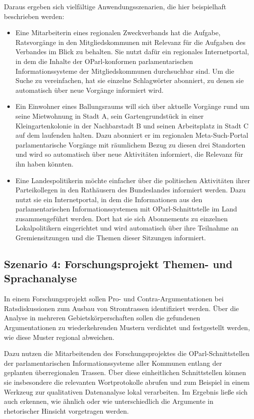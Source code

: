 \documentclass[,a4paper]{article}
\begin{document}
Daraus ergeben sich vielfältige Anwendungsszenarien, die hier
beispielhaft beschrieben werden:

\begin{itemize}
\item
  Eine Mitarbeiterin eines regionalen Zweckverbands hat die Aufgabe,
  Ratsvorgänge in den Mitgliedskommunen mit Relevanz für die Aufgaben
  des Verbandes im Blick zu behalten. Sie nutzt dafür ein regionales
  Internetportal, in dem die Inhalte der OParl-konformen
  parlamentarischen Informationssysteme der Mitgliedskommunen
  durchsuchbar sind. Um die Suche zu vereinfachen, hat sie einzelne
  Schlagwörter abonniert, zu denen sie automatisch über neue Vorgänge
  informiert wird.
\item
  Ein Einwohner eines Ballungsraums will sich über aktuelle Vorgänge
  rund um seine Mietwohnung in Stadt A, sein Gartengrundstück in einer
  Kleingartenkolonie in der Nachbarstadt B und seinen Arbeitsplatz in
  Stadt C auf dem laufenden halten. Dazu abonniert er im regionalen
  Meta-Such-Portal parlamentarische Vorgänge mit räumlichem Bezug zu
  diesen drei Standorten und wird so automatisch über neue Aktivitäten
  informiert, die Relevanz für ihn haben könnten.
\item
  Eine Landespolitikerin möchte einfacher über die politischen
  Aktivitäten ihrer Parteikollegen in den Rathäusern des Bundeslandes
  informiert werden. Dazu nutzt sie ein Internetportal, in dem die
  Informationen aus den parlamentarischen Informationssystemen mit
  OParl-Schnittstelle im Land zusammengeführt werden. Dort hat sie sich
  Abonnements zu einzelnen Lokalpolitikern eingerichtet und wird
  automatisch über ihre Teilnahme an Gremiensitzungen und die Themen
  dieser Sitzungen informiert.
\end{itemize}

\subsection{Szenario 4: Forschungsprojekt Themen- und
Sprachanalyse}\label{szenarioux5fforschung}

In einem Forschungsprojekt sollen Pro- und Contra-Argumentationen bei
Ratsdiskussionen zum Ausbau von Stromtrassen identifiziert werden. Über
die Analyse in mehreren Gebietskörperschaften sollen die gefundenen
Argumentationen zu wiederkehrenden Mustern verdichtet und festgestellt
werden, wie diese Muster regional abweichen.

Dazu nutzen die Mitarbeitenden des Forschungsprojektes die
OParl-Schnittstellen der parlamentarischen Informationssysteme aller
Kommunen entlang der geplanten überregionalen Trassen. Über diese
einheitlichen Schnittstellen können sie insbesondere die relevanten
Wortprotokolle abrufen und zum Beispiel in einem Werkzeug zur
qualitativen Datenanalyse lokal verarbeiten. Im Ergebnis ließe sich auch
erkennen, wie ähnlich oder wie unterschiedlich die Argumente in
rhetorischer Hinsicht vorgetragen werden.
\end{document}
